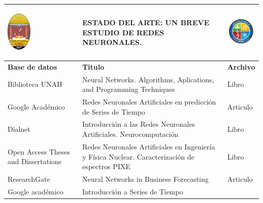 \documentclass[11pt,titlepage]{report}
\begin{document}
\begin{tabular}{ |p{3cm} | p{9cm} | p{2cm} |} 	\hline
	\begin{center}
		\includegraphics[width=1.2cm]{Pic/UNAH}
	\end{center} 	& 
	\begin{center}
		\textbf{ESTADO DEL ARTE: UN BREVE ESTUDIO DE REDES NEURONALES.}
	\end{center}       	& 
	\begin{center}
		\includegraphics[width=1.5cm]{Pic/Facu_ciencias.jpg} 
	\end{center}  	\\ \hline \hline
	
	\textbf{ Base de datos}   & \textbf{Titulo}    & \textbf{Archivo}    \\ \hline
	
	Biblioteca UNAH   & Neural Networks. Algorithms, Aplications, and Programming Techniques & Libro \\ \hline
	
	Google Académico & Redes Neuronales Artificiales en predicción de Series de Tiempo & Articulo \\ \hline
	
	Dialnet & Introducción a las Redes Neuronales Artificiales. Neurocomputación & Libro \\ \hline
	
	
	Open Access Theses and Dissertations & Redes Neuronales Artificiales en Ingeniería y Física Nuclear. Caracterización de espectros PIXE & Libro \\
	
	ResearchGate   &   Neural Networks in Business Forecasting    &  Articulo \\ \hline
	
	Google académico  &  Introducción a Series de Tiempo    &   \\ \hline
	\end{tabular} 
\clearpage
\end{document}
